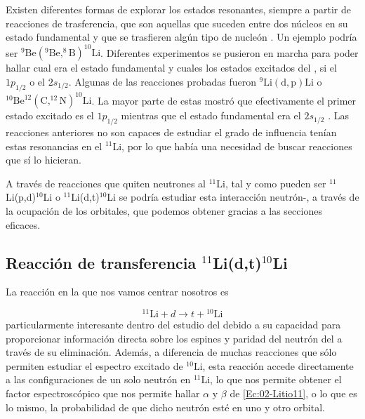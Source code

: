 Existen diferentes formas de explorar los estados resonantes, siempre a partir de reacciones de trasferencia, que son aquellas que suceden entre dos núcleos en su estado fundamental y que se trasfieren algún tipo de nucleón \cite{Tanihata2023DirectNuclearReactions}. Un ejemplo podría ser $^{9}\text{Be}(^{9}\text{Be},^{8}\text{B})^{10}\text{Li}$. Diferentes experimentos se pusieron en marcha para poder hallar cual era el estado fundamental y cuales los estados excitados del \litioDiez, si el $1p_{1/2}$ o el $2s_{1/2}$. Algunas de las reacciones probadas fueron $^{9}\text{Li}(\text{d},\text{p})\text{Li}$ o $^{10}\text{Be}^{12}(\text{C}, ^{12}\text{N})^{10} \text{Li}$. La mayor parte de estas mostró que efectivamente el primer estado excitado es el $1p_{1/2}$ mientras que el estado fundamental era el $2s_{1/2}$ \cite{SANETULLAEV2016481}. Las reacciones anteriores no son capaces de estudiar el grado de influencia tenían estas resonancias en el $^{11}$Li, por lo que había una necesidad de buscar reacciones que sí lo hicieran. 


A través de reacciones que quiten neutrones al $^{11}$Li, tal y como pueden ser  $^{11}$Li(p,d)$^{10}$Li o $^{11}$Li(d,t)$^{10}$Li se podría estudiar esta interacción neutrón-\litioDiez, a través de la ocupación de los orbitales, que podemos obtener gracias a las secciones eficaces.




\subsection{Reacción de transferencia $^{11}$Li(d,t)$^{10}$Li}

La reacción en la que nos vamos centrar nosotros es

\begin{equation}
   {}^{11}\text{Li} + d \to t + {}^{10}\text{Li}
\end{equation}
particularmente interesante dentro del estudio del \litioOnce debido a su capacidad para proporcionar información directa sobre los espines y paridad del neutrón del \litioOnce a través de su eliminación. Además, a diferencia de muchas reacciones que sólo permiten estudiar el espectro excitado de \({}^{10}\text{Li}\), esta reacción accede directamente a las configuraciones de un solo neutrón en \({}^{11}\text{Li}\), lo que nos permite obtener el factor espectroscópico que nos permite hallar $\alpha$ y $\beta$ de \cref{Ec:02-Litio11}, o lo que es lo mismo, la probabilidad de que dicho neutrón esté en uno y otro orbital. 
 

